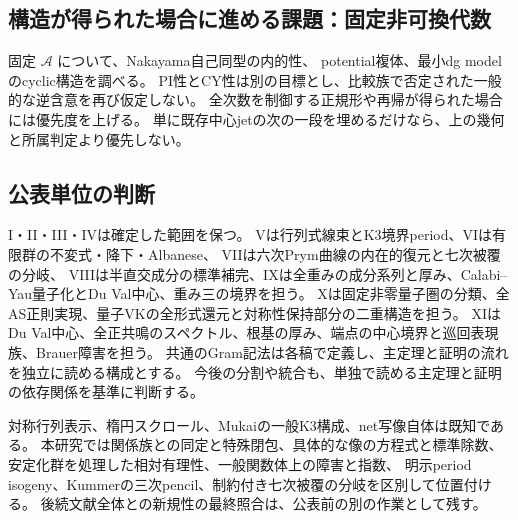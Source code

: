 \subsection{構造が得られた場合に進める課題：固定非可換代数}
固定 $\mathcal A$ について、Nakayama自己同型の内的性、
potential複体、最小dg modelのcyclic構造を調べる。
PI性とCY性は別の目標とし、比較族で否定された一般的な逆含意を再び仮定しない。
全次数を制御する正規形や再帰が得られた場合には優先度を上げる。
単に既存中心jetの次の一段を埋めるだけなら、上の幾何と所属判定より優先しない。

\subsection{公表単位の判断}
I・II・III・IVは確定した範囲を保つ。
Vは行列式線束とK3境界period、VIは有限群の不変式・降下・Albanese、
VIIは六次Prym曲線の内在的復元と七次被覆の分岐、
VIIIは半直交成分の標準補完、IXは全重みの成分系列と厚み、Calabi--Yau量子化とDu Val中心、重み三の境界を担う。
Xは固定非零量子圏の分類、全AS正則実現、量子VKの全形式還元と対称性保持部分の二重構造を担う。
XIはDu Val中心、全正共鳴のスペクトル、根基の厚み、端点の中心境界と巡回表現族、Brauer障害を担う。
共通のGram記法は各稿で定義し、主定理と証明の流れを独立に読める構成とする。
今後の分割や統合も、単独で読める主定理と証明の依存関係を基準に判断する。

対称行列表示、楕円スクロール、Mukaiの一般K3構成、net写像自体は既知である。
本研究では関係族との同定と特殊閉包、具体的な像の方程式と標準除数、
安定化群を処理した相対有理性、一般関数体上の障害と指数、
明示period isogeny、Kummerの三次pencil、制約付き七次被覆の分岐を区別して位置付ける。
後続文献全体との新規性の最終照合は、公表前の別の作業として残す。

